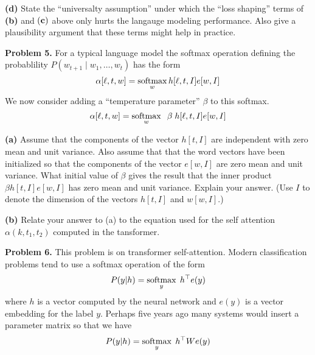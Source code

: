 \documentclass{article}
\newcommand{\solution}[1]{}
\begin{document}
\medskip
{\bf (d)} State the ``universalty assumption'' under which the ``loss shaping'' terms of {\bf (b)} and ${\bf (c)}$ above only hurts the langauge modeling performance.  Also give a plausibility argument
that these terms might help in practice.

\solution{The universality assumption is that the model parameters will be be optimized so as to find the actual minimum of the loss on the population distribution.  In that case
  the loss shaping terms can only hurt performance.  If, on the other hand, the training does not find the optimal parameters on the population then it seems plausible that the loss shaping terms might help with the optimization or the generalization.}
  

\bigskip
{\bf Problem 5.} For a typical language model the softmax operation defining the probablility $P(w_{t+1}\;|\;w_1,\ldots,w_t)$ has the form
$$\alpha[\ell,t,w] = \operatorname*{softmax}_{w} h[\ell,t,I] e[w,I]$$
We now consider adding a ``temperature parameter'' $\beta$ to this softmax.
\begin{equation}
  \alpha[\ell,t,w] = \operatorname*{softmax}_{w}\;\; \beta\;h[\ell,t,I] e[w,I] \label{eqlang}
\end{equation}


\medskip
{\bf (a)} Assume that the components of the vector $h[t,I]$ are independent with zero mean and unit variance.  Also assume that that the word vectors have
been initialized so that the components of the vector $e[w,I]$ are zero mean and unit variance.  What initial value of $\beta$ gives the result that
the inner product $\beta h[t,I]e[w,I]$ has zero mean and unit variance. Explain your answer.  (Use $I$ to denote the dimension of the vectors $h[t,I]$ and $w[w,I]$.)

\solution{The mean of a sum of zero mean variables has zero mean.  The standard deviation of a sum of $I$ independent variables each with unit variance
  is $\sqrt{I}$.  Therrefore we get unit variance by setting $\beta = \frac{1}{\sqrt{I}}$.
  }

\medskip
{\bf (b)} Relate your answer to (a) to the equation used for the self attention $\alpha(k,t_1,t_2)$ computed in the tansformer.

\solution{The transformer attention is given by
  $$\alpha[\ell,k,t_1,t_2] = \softmax_{t_2}\; \frac{1}{\sqrt{I}}\;\mathrm{Query}[\ell,k,t_1,I]\mathrm{Key}[\ell,k,t_2,I]$$
  This has the same ``temperature parameter'' as the answer to part (a).}

\bigskip
{\bf Problem 6.} This problem is on transformer self-attention.  Modern classification problems tend to use a softmax operation of the form
\begin{equation}
  P(y|h) = \operatorname*{softmax}_y\;h^\top e(y) \label{eqproduct}
\end{equation}
where $h$ is a vector computed by the neural network and $e(y)$ is a vector embedding for the label $y$.  Perhaps five years ago many systems would insert a parameter matrix
so that we have
\begin{equation}
  P(y|h) = \operatorname*{softmax}_y\;h^\top W e(y) \label{eqgenprod}
\end{equation}
\end{document}
